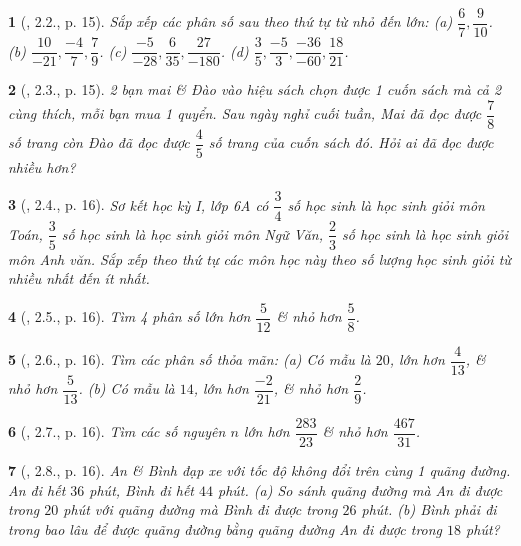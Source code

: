 \documentclass{article}
\newtheorem{baitoan}{}
\begin{document}
\begin{baitoan}[\cite{Binh_boi_duong_Toan_6_tap_2}, 2.2., p. 15]
	Sắp xếp các phân số sau theo thứ tự từ nhỏ đến lớn: (a) $\dfrac{6}{7},\dfrac{9}{10}$. (b) $\dfrac{10}{-21},\dfrac{-4}{7},\dfrac{7}{9}$. (c) $\dfrac{-5}{-28},\dfrac{6}{35},\dfrac{27}{-180}$. (d) $\dfrac{3}{5},\dfrac{-5}{3},\dfrac{-36}{-60},\dfrac{18}{21}$.
\end{baitoan}

\begin{baitoan}[\cite{Binh_boi_duong_Toan_6_tap_2}, 2.3., p. 15]
	2 bạn mai \& Đào vào hiệu sách chọn được 1 cuốn sách mà cả 2 cùng thích, mỗi bạn mua 1 quyển. Sau ngày nghỉ cuối tuần, Mai đã đọc được $\dfrac{7}{8}$ số trang còn Đào đã đọc được $\dfrac{4}{5}$ số trang của cuốn sách đó. Hỏi ai đã đọc được nhiều hơn?
\end{baitoan}

\begin{baitoan}[\cite{Binh_boi_duong_Toan_6_tap_2}, 2.4., p. 16]
	Sơ kết học kỳ I, lớp 6A có $\dfrac{3}{4}$ số học sinh là học sinh giỏi môn Toán, $\dfrac{3}{5}$ số học sinh là học sinh giỏi môn Ngữ Văn, $\dfrac{2}{3}$ số học sinh là học sinh giỏi môn Anh văn. Sắp xếp theo thứ tự các môn học này theo số lượng học sinh giỏi từ nhiều nhất đến ít nhất.
\end{baitoan}

\begin{baitoan}[\cite{Binh_boi_duong_Toan_6_tap_2}, 2.5., p. 16]
	Tìm 4 phân số lớn hơn $\dfrac{5}{12}$ \& nhỏ hơn $\dfrac{5}{8}$.
\end{baitoan}

\begin{baitoan}[\cite{Binh_boi_duong_Toan_6_tap_2}, 2.6., p. 16]
	Tìm các phân số thỏa mãn: (a) Có mẫu là $20$, lớn hơn $\dfrac{4}{13}$, \& nhỏ hơn $\dfrac{5}{13}$. (b) Có mẫu là $14$, lớn hơn $\dfrac{-2}{21}$, \& nhỏ hơn $\dfrac{2}{9}$.
\end{baitoan}

\begin{baitoan}[\cite{Binh_boi_duong_Toan_6_tap_2}, 2.7., p. 16]
	Tìm các số nguyên $n$ lớn hơn $\dfrac{283}{23}$ \& nhỏ hơn $\dfrac{467}{31}$.
\end{baitoan}

\begin{baitoan}[\cite{Binh_boi_duong_Toan_6_tap_2}, 2.8., p. 16]
	An \& Bình đạp xe với tốc độ không đổi trên cùng 1 quãng đường. An đi hết $36$ phút, Bình đi hết $44$ phút. (a) So sánh quãng đường mà An đi được trong $20$ phút với quãng đường mà Bình đi được trong $26$ phút. (b) Bình phải đi trong bao lâu để được quãng đường bằng quãng đường An đi được trong $18$ phút?
\end{baitoan}
\end{document}
